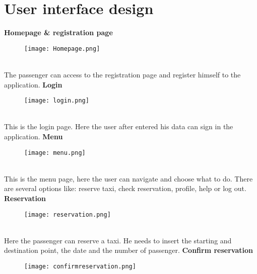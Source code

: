 \documentclass[12pt, oneside]{book}   	%
\begin{document}
\section{User interface design}
\vspace{2cm}
\hspace*{\fill}
\textbf{\large Homepage \& registration page}
\hspace*{\fill}
\begin{figure}[h]
\centering
\texttt{[image: Homepage.png]}
\end{figure}
\\
The passenger can access to the registration page and register himself to the application.
\clearpage
\hspace*{\fill}
\textbf{\large Login}
\hspace*{\fill}
\begin{figure}[h]
\centering
\texttt{[image: login.png]}
\end{figure}
\\
This is the login page. Here the user after entered his data can sign in the application.
\vspace{1cm}
\clearpage
\hspace*{\fill}
\textbf{\large Menu}
\hspace*{\fill}
\\
\begin{figure}[h]
\centering 
\texttt{[image: menu.png]}
\end{figure}
\\
This is the menu page, here the user can navigate and choose what to do. There are several options like: reserve taxi, check reservation, profile, help or log out.
\clearpage
\hspace*{\fill}
\textbf{\large Reservation}
\hspace*{\fill}
\\
\begin{figure}[h]
\center \texttt{[image: reservation.png]}
\end{figure}
\\
Here the passenger can reserve a taxi. He needs to insert the starting and destination point, the date and the number of passenger.
\clearpage
\hspace*{\fill}
\textbf{\large Confirm reservation}
\hspace*{\fill}
\\
\begin{figure}[h]
\center \texttt{[image: confirmreservation.png]}
\end{figure}
\end{document}
